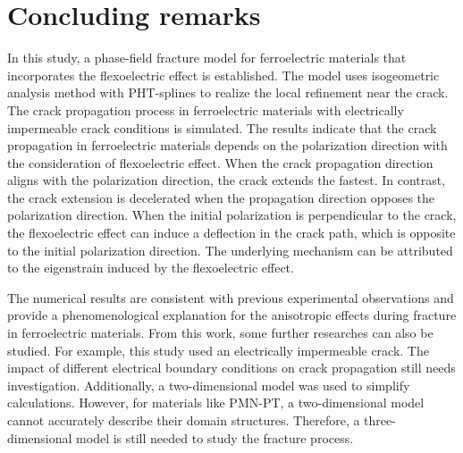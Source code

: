 \section{Concluding remarks}\label{Section5}
In this study, a phase-field fracture model for ferroelectric materials that incorporates the flexoelectric effect is established. The model uses isogeometric analysis method with PHT-splines to realize the local refinement near the crack. The crack propagation process in ferroelectric materials with electrically impermeable crack conditions is simulated. The results indicate that the crack propagation in ferroelectric materials depends on the polarization direction with the consideration of flexoelectric effect. When the crack propagation direction aligns with the polarization direction, the crack extends the fastest. In contrast, the crack extension is decelerated when the propagation direction opposes the polarization direction. When the initial polarization is perpendicular to the crack, the flexoelectric effect can induce a deflection in the crack path, which is opposite to the initial polarization direction. The underlying mechanism can be attributed to the eigenstrain induced by the flexoelectric effect.

The numerical results are consistent with previous experimental observations  and  provide a phenomenological explanation for the anisotropic effects during fracture in ferroelectric materials. From this work, some further researches can also be studied. For example, this study used an electrically impermeable crack. The impact of different electrical boundary conditions on crack propagation still needs investigation. Additionally, a two-dimensional model was used to simplify calculations. However, for materials like PMN-PT, a two-dimensional model cannot accurately describe their domain structures. Therefore, a three-dimensional model is still needed to study the fracture process.